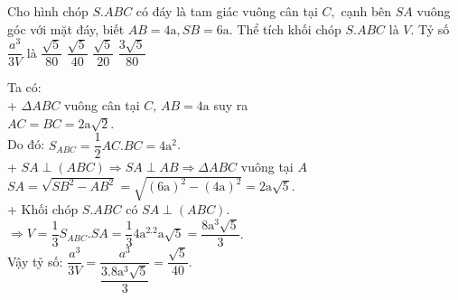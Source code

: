 \begin{ex}%
 Cho hình chóp $ S.ABC$ có đáy là tam giác vuông cân tại $ C,$ cạnh bên $SA$ vuông góc với mặt đáy, biết $ AB=4\text{a},SB=6\text{a}.$ Thể tích khối chóp $ S.ABC$ là $ V.$ Tỷ số $\dfrac{a^3}{3V}$ là
\choice
{$\dfrac{\sqrt{5}}{80}$}
{\True $\dfrac{\sqrt{5}}{40}$}
{$\dfrac{\sqrt{5}}{20}$}
{$\dfrac{3\sqrt{5}}{80}$}
\loigiai
{
\begin{minipage}[ht]{0.5\textwidth}
    Ta có:\\
+ $\Delta ABC$ vuông cân tại $ C,\,AB=4\text{a}$ suy ra\\
$ AC=BC=2\text{a}\sqrt{2}$.\\
Do đó: $S_{ABC}=\dfrac{1}{2}AC.BC=4\text{a}^2$.\\
+ $SA\perp\left(ABC\right)\Rightarrow SA\perp AB\Rightarrow\Delta ABC$ vuông tại $ A$\\
$ SA=\sqrt{S{B^2}-A{B^2}}=\sqrt{\left(6\text{a}\right)^2-\left(4\text{a}\right)^2}=2\text{a}\sqrt{5}$.\\
+ Khối chóp $S.ABC$ có $ SA\perp\left(ABC\right)$.\\
$\Rightarrow V=\dfrac{1}{3}{S_{ABC}}.SA=\dfrac{1}{3}4\text{a}^2.2\text{a}\sqrt{5}=\dfrac{8\text{a}^3\sqrt{5}}{3}$.\\
Vậy tỷ số: $\dfrac{a^3}{3V}=\dfrac{a^3}{\dfrac{3.8\text{a}^3\sqrt{5}}{3}}=\dfrac{\sqrt{5}}{40}$.
\end{minipage}
\begin{minipage}[ht]{0.5\textwidth}
  \begin{center}
\end{center}
\end{minipage}

}
\end{ex}

